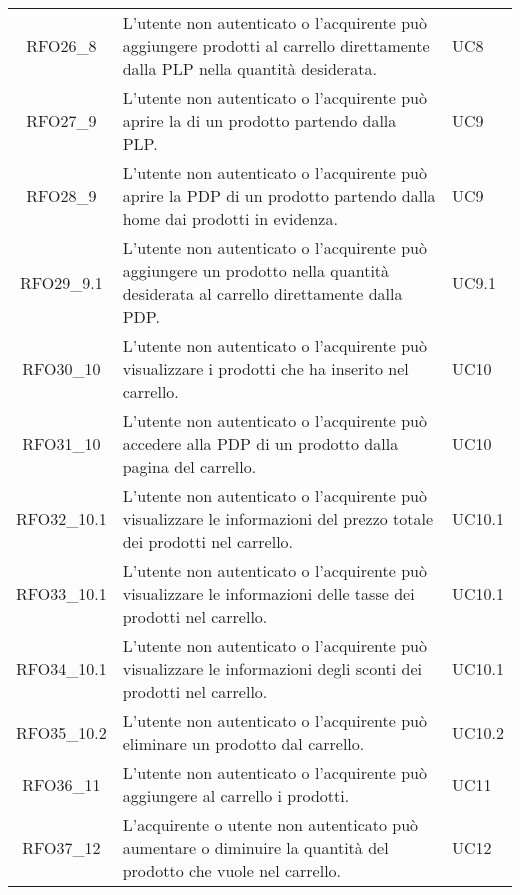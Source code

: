 \begin{longtable}{|c C{9.5cm} C{2.5cm}|}
    RFO26\_8 & L'utente non autenticato o l'acquirente può aggiungere prodotti al carrello direttamente dalla PLP nella quantità desiderata. & UC8 \\
    
    RFO27\_9 & L'utente non autenticato o l'acquirente può aprire la  di un prodotto partendo dalla PLP. & UC9 \\
    
    RFO28\_9 & L'utente non autenticato o l'acquirente può aprire la PDP di un prodotto partendo dalla home dai prodotti in evidenza. & UC9 \\

    RFO29\_9.1 & L'utente non autenticato o l'acquirente può aggiungere un prodotto nella quantità desiderata al carrello direttamente dalla PDP. & UC9.1 \\
    
    RFO30\_10 & L'utente non autenticato o l'acquirente può visualizzare i prodotti che ha inserito nel carrello. & UC10 \\
    
    RFO31\_10 & L'utente non autenticato o l'acquirente può accedere alla PDP di un prodotto dalla pagina del carrello. & UC10 \\
    
    RFO32\_10.1 & L'utente non autenticato o l'acquirente può visualizzare le informazioni del prezzo totale dei prodotti nel carrello. & UC10.1 \\
    
    RFO33\_10.1 &L'utente non autenticato o l'acquirente può visualizzare le informazioni delle tasse dei prodotti nel carrello. & UC10.1 \\
    
    RFO34\_10.1 & L'utente non autenticato o l'acquirente può visualizzare le informazioni degli sconti dei prodotti nel carrello. & UC10.1 \\
    
    RFO35\_10.2 & L'utente non autenticato o l'acquirente può eliminare un prodotto dal carrello. & UC10.2 \\
    
    RFO36\_11 & L'utente non autenticato o l'acquirente può aggiungere al carrello i prodotti. & UC11 \\
    
    RFO37\_12 & L'acquirente o utente non autenticato può aumentare o diminuire la quantità del prodotto che vuole nel carrello. & UC12 \\
    

\end{longtable}
